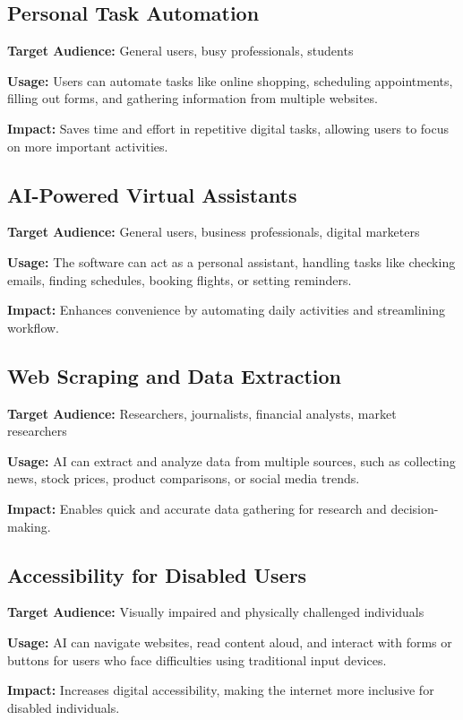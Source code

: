 \documentclass[conference]{IEEEtran}
\begin{document}
\subsection{Personal Task Automation}
\textbf{Target Audience:} General users, busy professionals, students

\textbf{Usage:} Users can automate tasks like online shopping, scheduling appointments, filling out forms, and gathering information from multiple websites.

\textbf{Impact:} Saves time and effort in repetitive digital tasks, allowing users to focus on more important activities.

\subsection{AI-Powered Virtual Assistants}
\textbf{Target Audience:} General users, business professionals, digital marketers

\textbf{Usage:} The software can act as a personal assistant, handling tasks like checking emails, finding schedules, booking flights, or setting reminders.

\textbf{Impact:} Enhances convenience by automating daily activities and streamlining workflow.

\subsection{Web Scraping and Data Extraction}
\textbf{Target Audience:} Researchers, journalists, financial analysts, market researchers

\textbf{Usage:} AI can extract and analyze data from multiple sources, such as collecting news, stock prices, product comparisons, or social media trends.

\textbf{Impact:} Enables quick and accurate data gathering for research and decision-making.

\subsection{Accessibility for Disabled Users}
\textbf{Target Audience:} Visually impaired and physically challenged individuals

\textbf{Usage:} AI can navigate websites, read content aloud, and interact with forms or buttons for users who face difficulties using traditional input devices.

\textbf{Impact:} Increases digital accessibility, making the internet more inclusive for disabled individuals.
\end{document}
